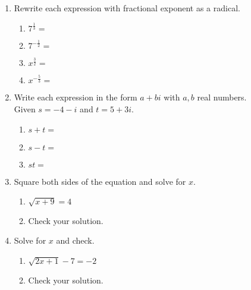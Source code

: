 \documentclass[12pt, twoside]{article}
\begin{document}
\begin{enumerate}[itemsep=0.5cm]
\item Rewrite each expression with fractional exponent as a radical.
    \begin{multicols}{2}
      \begin{enumerate}[itemsep=1cm]
        \item $\displaystyle 7^{\frac{1}{3}}=$
        \item $\displaystyle 7^{-\frac{1}{2}}=$
        \item $\displaystyle x^{\frac{3}{2}}=$
        \item $\displaystyle x^{-\frac{5}{3}}=$
      \end{enumerate}
      \end{multicols}

\newpage

\item Write each expression in the form $a+bi$ with $a,b$ real numbers. \\[0.25cm]
    Given  $s = -4 - i $ and $t = 5 + 3i$.
        \begin{enumerate}[itemsep=1.5cm]
            \item $s+t =$
            \item $s-t =$
            \item $st =$
        \end{enumerate} \vspace{3cm}

\item Square both sides of the equation and solve for $x$.
    \begin{multicols}{2}
    \begin{enumerate}[itemsep=0.5cm]
        \item  $\sqrt{x+9}=4$
        \item Check your solution.
    \end{enumerate}
    \end{multicols} \vspace{3cm}

\item Solve for $x$ and check.
    \begin{multicols}{2}
    \begin{enumerate}[itemsep=0.5cm]
        \item  $\sqrt{2x+1} - 7 = -2$
        \item Check your solution.
    \end{enumerate}
    \end{multicols} \vspace{3cm}


\end{enumerate}
\end{document}
